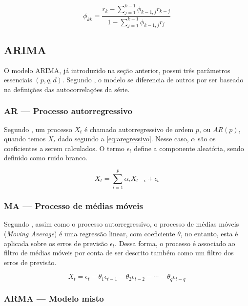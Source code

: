 \documentclass[
    12pt,
    oneside,
    a4paper,
    english,
    brazil
]{abntex2}
\begin{document}
\begin{equation}
    \label{eq:facp}
    \phi_{kk} = \frac{r_k-\sum_{j=1}^{k-1}{\phi_{k-1,j}r_{k-j}}}{1-\sum_{j=1}^{k-1}{\phi_{k-1,j}r_{j}}}
\end{equation}

\subsection{ARIMA}

O  modelo ARIMA,  já  introduzido  na seção  anterior,  possui três  parâmetros
essenciais  $(p,q,d)$.  Segundo ,  o  modelo  se diferencia  de
outros por ser baseado na definições das autocorrelações da série.

\subsubsection{AR --- Processo autorregressivo}

Segundo  ,  um  processo  $X_t$  é  chamado  autorregressivo
de   ordem   $p$,   ou   $AR(p)$,   quando   temos   $X_t$   dado   segundo   a
\autoref{eq:aregressivo}.  Nesse caso,  $\alpha$  são os  coeficientes a  serem
calculados. O termo $\epsilon_t$ define  a componente aleatória, sendo definido
como ruido branco.

\begin{equation}
    \label{eq:aregressivo}
    X_t = \sum_{i = 1}^{p}{\alpha_{i}X_{t-i}} + \epsilon_t
\end{equation}

\subsubsection{MA --- Processo de médias móveis}

Segundo , assim como o  processo autorregressivo, o processo de
médias móveis (\textit{Moving Average}) é uma regressão linear, com coeficiente
$\theta$, no entanto, esta é aplicada  sobre os erros de previsão $\epsilon_t$.
Dessa forma, o processo é associado ao filtro de médias móveis por conta de ser
descrito também como um filtro dos erros de previsão.

\begin{equation}
    \label{eq:pmediasmoveis}
    X_t = \epsilon_t - \theta_1\epsilon_{t-1} - \theta_2\epsilon_{t-2} - \cdots - \theta_{q}\epsilon_{t-q}
\end{equation}

\subsubsection{ARMA --- Modelo misto}
\end{document}

